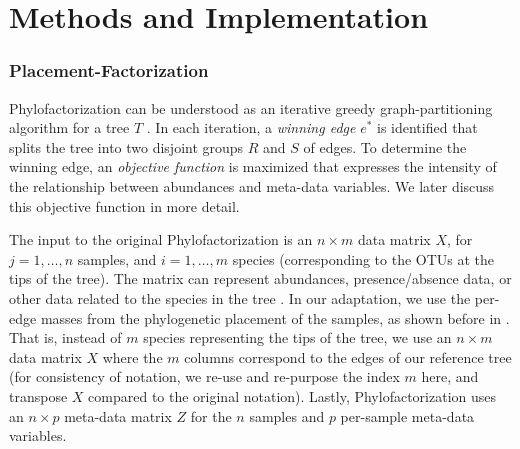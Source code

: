
\section{Methods and Implementation}
\label{ch:Factorization:sec:Methods}


\subsubsection*{Placement-Factorization}
\label{sec:Factorization:sub:PhyloFactorization:sub:Phylofactor}

Phylofactorization can be understood as an iterative greedy graph-partitioning algorithm for a tree $T$ \cite{Washburne2018}.
In each iteration, a \emph{winning edge} $e^*$ is identified
that splits the tree into two disjoint groups $R$ and $S$ of edges.
To determine the winning edge, an \emph{objective function} is maximized
that expresses the intensity of the relationship between abundances and meta-data variables.
We later discuss this objective function in more detail.

The input to the original Phylofactorization is an $n \times m$ data matrix $X$,
for $j = 1, \ldots, n$ samples, and $i = 1, \ldots, m$ species (corresponding to the OTUs at the tips of the tree).
The matrix can represent abundances, presence/absence data, or other data related to the species in the tree \cite{Washburne2019}.
In our adaptation, we use the per-edge masses from the phylogenetic placement of the samples,
as shown before in .
That is, instead of $m$ species representing the tips of the tree,
we use an $n \times m$ data matrix $X$ where the $m$ columns correspond to the edges of our reference tree
(for consistency of notation, we re-use and re-purpose the index $m$ here,
and transpose $X$ compared to the original notation).
Lastly, Phylofactorization uses an $n \times p$ meta-data matrix $Z$ for the $n$ samples
and $p$ per-sample meta-data variables.


